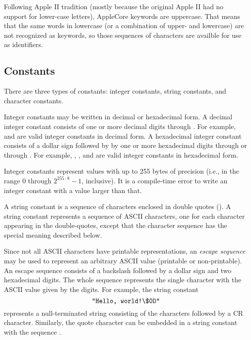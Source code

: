 \documentclass[10pt]{article}
\begin{document}
Following Apple II tradition (mostly because the original Apple II had
no support for lower-case letters), AppleCore keywords are uppercase.
That means that the same words in lowercase (or a combination of
upper- and lowercase) are not recognized as keywords, so those
sequences of characters are availble for use as identifiers.

\subsection{Constants}
\label{sec:lexical:constants}

There are three types of constants: integer constants, string
constants, and character constants.  

  Integer constants may be written in
decimal or hexadecimal form.  A decimal integer constant consists of
one or more decimal digits  through .  For example,
 and  are valid integer constants in decimal form.  A
hexadecimal integer constant consists of a dollar sign \kwd{\$}
followed by by one or more hexadecimal digits  through 
or  through .  For example, , , and
 are valid integer constants in hexadecimal form.

Integer constants represent values with up to 255 bytes of precision
(i.e., in the range $0$ through $2^{255 \cdot 8}-1$, inclusive).  It
is a compile-time error to write an integer constant with a value
larger than that.

 A string constant is a sequence of
characters enclosed in double quotes ().  A string constant
represents a sequence of ASCII characters, one for each character
appearing in the double-quotes, except that the character sequence
\kwd{\bs\$} has the special meaning described below.

Since not all ASCII characters have printable representations, an
\emph{escape sequence} may be used to represent an arbitrary ASCII
value (printable or non-printable).  An escape sequence consists of a
backslash \kwd{\bs} followed by a dollar sign \kwd{\$} and two
hexadecimal digits.  The whole sequence represents the single
character with the ASCII value given by the digits.  For example, the
string constant
%
$$\texttt{"Hello, world!\textbackslash\$0D"}$$
%
represents a null-terminated string consisting of the characters
 followed by a CR character.  Similarly, the quote
character  can be embedded in a string constant with the
sequence .
\end{document}
